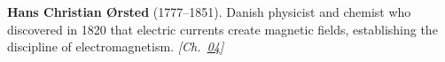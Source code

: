 \textbf{Hans Christian Ørsted} (1777–1851). Danish physicist and chemist who discovered in 1820 that electric currents create magnetic fields, establishing the discipline of electromagnetism. \emph{[Ch.~\hyperref[ch:energytransmission]{04}]}

